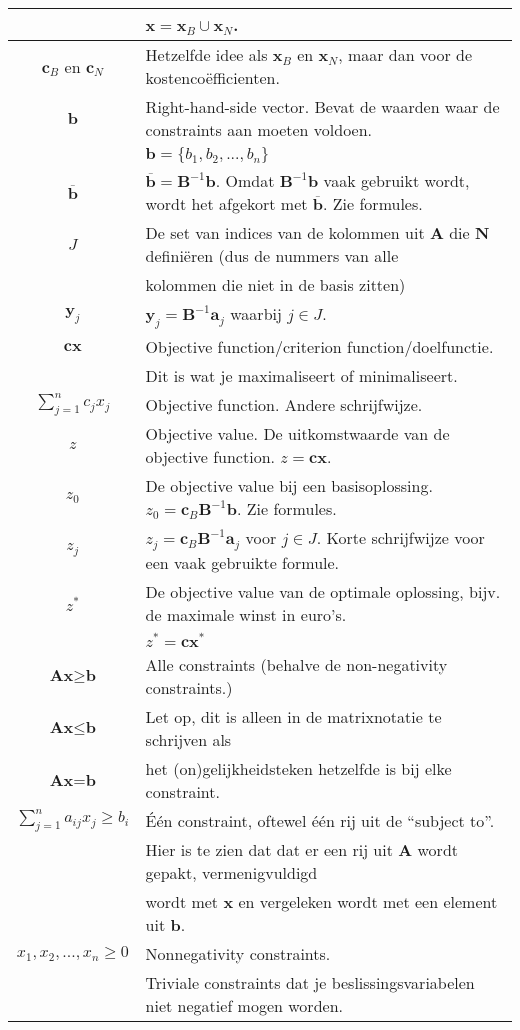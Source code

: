 \documentclass[10pt,a4paper]{article}
\begin{document}
\begin{tabular}{|c|l|}
 & $\textbf{x} = \textbf{x}_B \cup \textbf{x}_N$. \\
\hline
$\textbf{c}_B$ en $\textbf{c}_N$ & Hetzelfde idee als $\textbf{x}_B$ en $\textbf{x}_N$, maar dan voor de kostencoëfficienten. \\
\hline
$\textbf{b}$ & Right-hand-side vector. Bevat de waarden waar de constraints aan moeten voldoen.\\
 & $\textbf{b} = \{b_1, b_2, ..., b_n\}$\\
\hline
$\overline{\textbf{b}}$ & $\overline{\textbf{b}} = \textbf{B}^{-1}\textbf{b}$. Omdat $\textbf{B}^{-1}\textbf{b}$ vaak gebruikt wordt, wordt het afgekort met $\overline{\textbf{b}}$. Zie formules. \\
\hline
$J$ & De set van indices van de kolommen uit $\textbf{A}$ die $\textbf{N}$ definiëren (dus de nummers van alle \\
& kolommen die niet in de basis zitten) \\
\hline
$\textbf{y}_j$ & $\textbf{y}_j = \textbf{B}^{-1}\textbf{a}_j$ waarbij $j \in J$. \\
\hline
$\textbf{cx}$ & Objective function/criterion function/doelfunctie. \\ & 	Dit is wat je maximaliseert of minimaliseert.\\
\hline
$\displaystyle\sum\limits_{j=1}^n c_jx_j$ & Objective function. Andere schrijfwijze. \\
\hline
$z$ & Objective value. De uitkomstwaarde van de objective function. $z = \textbf{cx}$.\\
\hline
$z_0$ & De objective value bij een basisoplossing. $z_0 = \textbf{c}_B\textbf{B}^{-1}\textbf{b}$. Zie formules. \\
\hline
$z_j$ & $z_j = \textbf{c}_B\textbf{B}^{-1}\textbf{a}_j$ voor $j \in J$. Korte schrijfwijze voor een vaak gebruikte formule. \\
\hline
$z^*$ & De objective value van de optimale oplossing, bijv. de maximale winst in euro's. \\ %
 & $z^* = \textbf{cx}^*$ \\
\hline
$\textbf{Ax} \geq \textbf{b}$ & Alle constraints (behalve de non-negativity constraints.)\\
$\textbf{Ax} \leq \textbf{b}$ & Let op, dit is alleen in de matrixnotatie te schrijven als \\
$\textbf{Ax} = \textbf{b}$ & het (on)gelijkheidsteken hetzelfde is bij elke constraint.\\
\hline
$\displaystyle\sum\limits_{j=1}^n a_{ij}x_j \ge b_i$ & Één constraint, oftewel één rij uit de ``subject to''.\\
 & Hier is te zien dat dat er een rij uit $\textbf{A}$ wordt gepakt, vermenigvuldigd \\ &  wordt met $\textbf{x}$ en vergeleken wordt met een element uit $\textbf{b}$. \\
\hline
$x_1, x_2, ..., x_n \geq 0$ & Nonnegativity constraints. \\ & Triviale constraints dat je beslissingsvariabelen niet negatief mogen worden.\\
\hline
\end{tabular}
\end{document}
